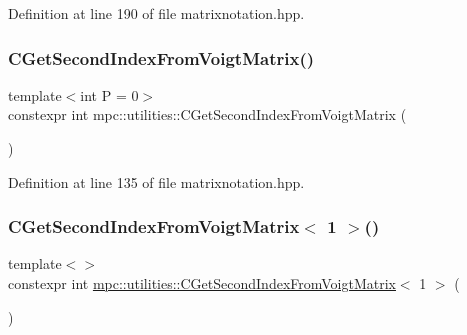 Definition at line 190 of file matrixnotation.\+hpp.

\mbox{\label{namespacempc_1_1utilities_a094a324d81b996e8397336286264dfcd}} 
\subsubsection{\texorpdfstring{C\+Get\+Second\+Index\+From\+Voigt\+Matrix()}{CGetSecondIndexFromVoigtMatrix()}}
{\footnotesize\ttfamily template$<$int P = 0$>$ \\
constexpr int mpc\+::utilities\+::\+C\+Get\+Second\+Index\+From\+Voigt\+Matrix (\begin{DoxyParamCaption}{ }\end{DoxyParamCaption})\hspace{0.3cm}{\ttfamily [inline]}}



Definition at line 135 of file matrixnotation.\+hpp.

\mbox{\label{namespacempc_1_1utilities_ac600a3a4e8be50854214d495b7672444}} 
\subsubsection{\texorpdfstring{C\+Get\+Second\+Index\+From\+Voigt\+Matrix$<$ 1 $>$()}{CGetSecondIndexFromVoigtMatrix< 1 >()}}
{\footnotesize\ttfamily template$<$$>$ \\
constexpr int \mbox{\hyperlink{namespacempc_1_1utilities_a094a324d81b996e8397336286264dfcd}{mpc\+::utilities\+::\+C\+Get\+Second\+Index\+From\+Voigt\+Matrix}}$<$ 1 $>$ (\begin{DoxyParamCaption}{ }\end{DoxyParamCaption})\hspace{0.3cm}{\ttfamily [inline]}}



